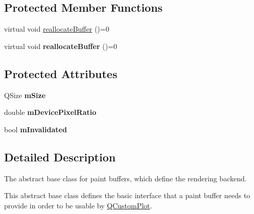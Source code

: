 \subsection*{Protected Member Functions}
\begin{DoxyCompactItemize}
\item 
virtual void \hyperlink{class_q_c_p_abstract_paint_buffer_aee7506a52bd7e5a07c2af27935eb13e7}{reallocate\+Buffer} ()=0
\item 
virtual void {\bfseries reallocate\+Buffer} ()=0\hypertarget{class_q_c_p_abstract_paint_buffer_a9bbd9f7520ccfa3e13fc737813f706e4}{}\label{class_q_c_p_abstract_paint_buffer_a9bbd9f7520ccfa3e13fc737813f706e4}

\end{DoxyCompactItemize}
\subsection*{Protected Attributes}
\begin{DoxyCompactItemize}
\item 
Q\+Size {\bfseries m\+Size}\hypertarget{class_q_c_p_abstract_paint_buffer_ae246c426222bfa18d5e8797fab73e3ce}{}\label{class_q_c_p_abstract_paint_buffer_ae246c426222bfa18d5e8797fab73e3ce}

\item 
double {\bfseries m\+Device\+Pixel\+Ratio}\hypertarget{class_q_c_p_abstract_paint_buffer_a33c1fd784478441fcff9ebf3d69af5b2}{}\label{class_q_c_p_abstract_paint_buffer_a33c1fd784478441fcff9ebf3d69af5b2}

\item 
bool {\bfseries m\+Invalidated}\hypertarget{class_q_c_p_abstract_paint_buffer_a3bc49cc9cf9daaca3a60977f010c08c9}{}\label{class_q_c_p_abstract_paint_buffer_a3bc49cc9cf9daaca3a60977f010c08c9}

\end{DoxyCompactItemize}


\subsection{Detailed Description}
The abstract base class for paint buffers, which define the rendering backend. 

This abstract base class defines the basic interface that a paint buffer needs to provide in order to be usable by \hyperlink{class_q_custom_plot}{Q\+Custom\+Plot}.

